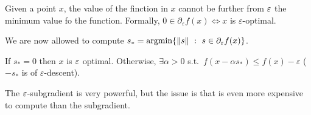 \documentclass[computationalMathematics.tex]{subfiles}
\begin{document}
\begin{proposition}
Given a point $x$, the value of the finction in $x$ cannot be further from $\varepsilon$ the minimum value fo the function.
  Formally, $0 \in \partial_\varepsilon f(x) \iff x$ is $\varepsilon$-optimal. 
\end{proposition}

We are now allowed to compute $s_* = \mbox{argmin} \{\left\lVert s\right\rVert~:~ s \in \partial_\varepsilon f(x)\}$.

If $s_* = 0$ then $x$ is $\varepsilon$ optimal. Otherwise, $\exists \alpha > 0$ s.t.~$f(x - \alpha s_*) \leq f(x) - \varepsilon$ ($- s_*$ is of $\varepsilon$-descent).

The $\varepsilon$-subgradient is very powerful, but the issue is that is even more expensive to compute than the subgradient.
\end{document}
